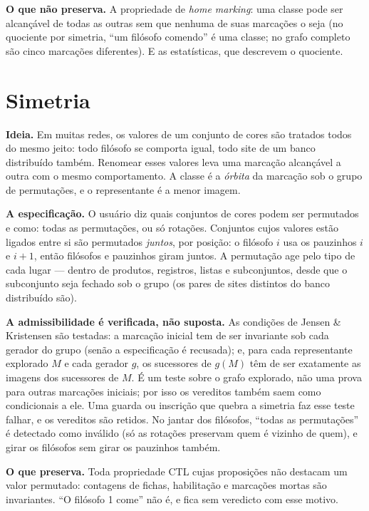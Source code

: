 \documentclass[11pt,a4paper]{report}
\theoremstyle{definition}
\begin{document}
\textbf{O que não preserva.} A propriedade de \emph{home marking}: uma classe
pode ser alcançável de todas as outras sem que nenhuma de suas marcações o
seja (no quociente por simetria, ``um filósofo comendo'' é uma classe; no grafo
completo são cinco marcações diferentes). E as estatísticas, que descrevem o
quociente.

\section{Simetria}

\textbf{Ideia.} Em muitas redes, os valores de um conjunto de cores são
tratados todos do mesmo jeito: todo filósofo se comporta igual, todo site de
um banco distribuído também. Renomear esses valores leva uma marcação
alcançável a outra com o mesmo comportamento. A classe é a \emph{órbita} da
marcação sob o grupo de permutações, e o representante é a menor imagem.

\textbf{A especificação.} O usuário diz quais conjuntos de cores podem ser
permutados e como: todas as permutações, ou só rotações. Conjuntos cujos
valores estão ligados entre si são permutados \emph{juntos}, por posição: o
filósofo $i$ usa os pauzinhos $i$ e $i+1$, então filósofos e pauzinhos giram
juntos. A permutação age pelo tipo de cada lugar --- dentro de produtos,
registros, listas e subconjuntos, desde que o subconjunto seja fechado sob o
grupo (os pares de sites distintos do banco distribuído são).

\textbf{A admissibilidade é verificada, não suposta.} As condições de Jensen
\& Kristensen são testadas: a marcação inicial tem de ser invariante sob cada
gerador do grupo (senão a especificação é recusada); e, para cada representante
explorado $M$ e cada gerador $g$, os sucessores de $g(M)$ têm de ser
exatamente as imagens dos sucessores de $M$. É um teste sobre o grafo
explorado, não uma prova para outras marcações iniciais; por isso os
vereditos também saem como condicionais a ele. Uma guarda ou inscrição que
quebra a simetria faz esse teste falhar, e os vereditos são retidos. No jantar
dos filósofos, ``todas as permutações'' é detectado como inválido (só as
rotações preservam quem é vizinho de quem), e girar os filósofos sem girar os
pauzinhos também.

\textbf{O que preserva.} Toda propriedade CTL cujas proposições não destacam
um valor permutado: contagens de fichas, habilitação e marcações mortas são
invariantes. ``O filósofo 1 come'' não é, e fica sem veredicto com esse
motivo.
\end{document}
